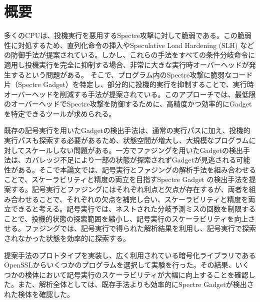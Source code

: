\section{概要}

多くのCPUは、投機実行を悪用するSpectre攻撃に対して脆弱である。この脆弱性に対処するため、直列化命令の挿入やSpeculative Load Hardening (SLH) などの防御手法が提案されている。しかし、これらの手法をすべての条件分岐命令に適用し投機実行を完全に抑制する場合、非常に大きな実行時オーバーヘッドが発生するという問題がある。
そこで、プログラム内のSpectre攻撃に脆弱なコード片（Spectre Gadget）を特定し、部分的に投機的実行を抑制することで、実行時オーバーヘッドを削減する手法が提案されている。このアプローチでは、最低限のオーバーヘッドでSpectre攻撃を防御するために、高精度かつ効率的にGadgetを特定できるツールが求められる。

既存の記号実行を用いたGadgetの検出手法は、通常の実行パスに加え、投機的実行パスも探索する必要があるため、状態空間が増大し、大規模なプログラムに対してスケールしない問題がある。一方でファジングを用いたGadgetの検出手法は、カバレッジ不足により一部の状態が探索されずGadgetが見逃される可能性がある。そこで本論文では、記号実行とファジングの解析手法を組み合わせることで、スケーラビリティと精度の両立を目指すSpectre Gadget の検出手法を提案する。記号実行とファジングにはそれぞれ利点と欠点が存在するが、両者を組み合わせることで、それぞれの欠点を補完し合い、スケーラビリティと精度を両立できると考える。記号実行では、ネストされた分岐予測ミスの回数を制限することで、投機的状態の探索範囲を縮小し、記号実行のスケーラビリティを向上させる。ファジングでは、記号実行で得られた解析結果を利用し、記号実行で探索されなかった状態を効率的に探索する。

提案手法のプロトタイプを実装し、広く利用されている暗号化ライブラリであるOpenSSLからいくつかのプログラムを選択して実験を行った。その結果、いくつかの検体において記号実行のスケーラビリティが大幅に向上することを確認した。また、解析全体としては、既存手法よりも効率的にSpectre Gadgetが検出された検体を確認した。

